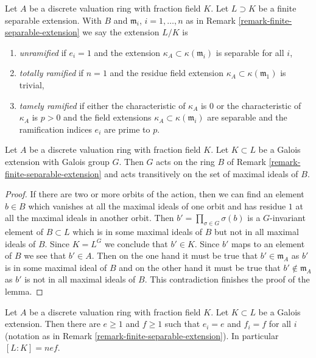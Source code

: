 \begin{definition}
\label{definition-types-of-extensions}
Let $A$ be a discrete valuation ring with fraction field $K$. Let $L \supset K$
be a finite separable extension. With $B$ and
$\mathfrak m_i$, $i = 1, \ldots, n$
as in Remark \ref{remark-finite-separable-extension} we say the extension
$L/K$ is
\begin{enumerate}
\item {\it unramified} if $e_i = 1$ and the extension
$\kappa_A \subset \kappa(\mathfrak m_i)$ is separable for all $i$,
\item {\it totally ramified} if $n = 1$ and the residue field extension
$\kappa_A \subset \kappa(\mathfrak m_1)$ is trivial,
\item {\it tamely ramified} if either the characteristic of $\kappa_A$
is $0$ or the characteristic of $\kappa_A$ is $p > 0$ and the field extensions
$\kappa_A \subset \kappa(\mathfrak m_i)$ are separable
and the ramification indices $e_i$ are prime to $p$.
\end{enumerate}
\end{definition}

\begin{lemma}
\label{lemma-galois}
Let $A$ be a discrete valuation ring with fraction field $K$.
Let $K \subset L$ be a Galois extension with Galois group $G$.
Then $G$ acts on the ring $B$ of Remark \ref{remark-finite-separable-extension}
and acts transitively on the set of maximal ideals of $B$.
\end{lemma}

\begin{proof}
If there are two or more orbits of the action, then we can find an
element $b \in B$ which vanishes at all the maximal ideals of one orbit
and has residue $1$ at all the maximal ideals in another orbit. Then
$b' = \prod_{\sigma \in G} \sigma(b)$ is a $G$-invariant element of
$B \subset L$ which is in some maximal ideals of $B$
but not in all maximal ideals of $B$. Since $K = L^G$ we conclude that
$b' \in K$. Since $b'$ maps to an element of $B$ we see that $b' \in A$.
Then on the one hand it must be true that $b' \in \mathfrak m_A$
as $b'$ is in some maximal ideal of $B$ and on the other hand it
must be true that $b' \not \in \mathfrak m_A$ as $b'$ is not in
all maximal ideals of $B$. This contradiction finishes the proof of the lemma.
\end{proof}

\begin{lemma}
\label{lemma-galois-conclusion}
Let $A$ be a discrete valuation ring with fraction field $K$.
Let $K \subset L$ be a Galois extension. Then there are $e \geq 1$ and
$f \geq 1$ such that $e_i = e$ and $f_i = f$ for all $i$ (notation
as in Remark \ref{remark-finite-separable-extension}). In particular
$[L : K] = n e f$.
\end{lemma}

